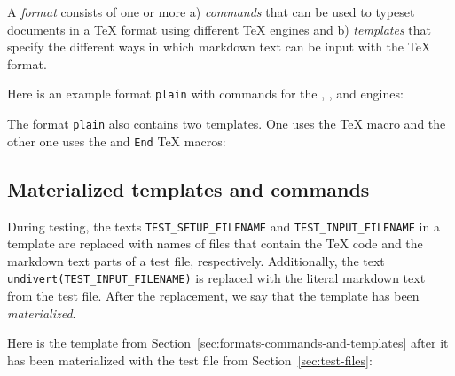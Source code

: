\documentclass[final]{ltugboat}
\begin{document}
A \emph{format} consists of one or more a) \emph{commands} that can be used to typeset documents in a \TeX{} format using different \TeX{} engines and b) \emph{templates} that specify the different ways in which markdown text can be input with the \TeX{} format.

Here is an example format \texttt{plain} with commands for the , , and  engines:

\smallskip
\noindent
\addtocounter{footnote}{1}%
%

\smallskip
\noindent
The format \texttt{plain} also contains two templates. One uses the  \TeX{} macro and the other one uses the  and \texttt{End} \TeX{} macros:

\smallskip
\noindent
{}

\smallskip
\exampleSeparator

\smallskip
\noindent
{}

\subsection{Materialized templates and commands}
\label{sec:materialized-templates-and-commands}

During testing, the texts \texttt{TEST\_SETUP\_FILENAME} and \texttt{TEST\_INPUT\_FILENAME} in a template are replaced with names of files that contain the \TeX{} code and the markdown text parts of a test file, respectively. Additionally, the text \texttt{undivert(TEST\_INPUT\_FILENAME)} is replaced with the literal markdown text from the test file. After the replacement, we say that the template has been \emph{materialized}.

Here is the template  from Section~\ref{sec:formats-commands-and-templates} after it has been materialized with the test file  from Section~\ref{sec:test-files}:

\smallskip
\noindent
{} \\[0.4em]
\end{document}
